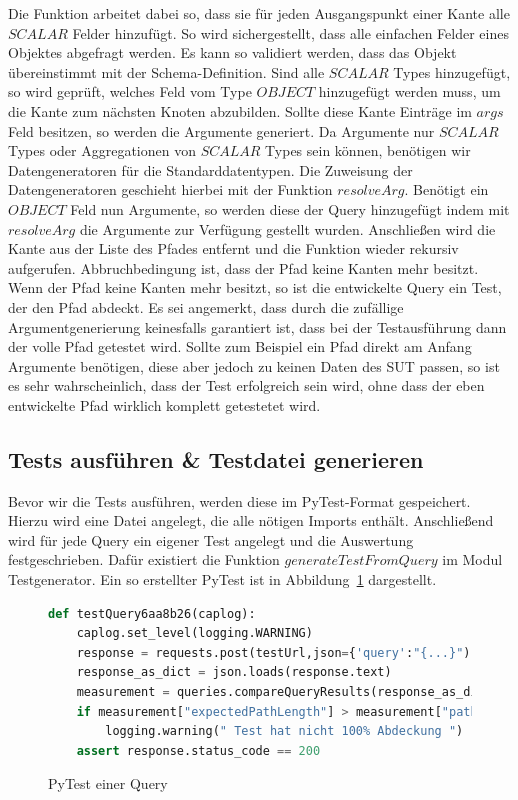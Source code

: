 Die Funktion arbeitet dabei so, dass sie für jeden Ausgangspunkt einer Kante alle $SCALAR$ Felder hinzufügt.
So wird sichergestellt, dass alle einfachen Felder eines Objektes abgefragt werden.
Es kann so validiert werden, dass das Objekt übereinstimmt mit der Schema-Definition.
Sind alle $SCALAR$ Types hinzugefügt, so wird geprüft, welches Feld vom Type $OBJECT$ hinzugefügt werden muss, um die Kante zum nächsten Knoten abzubilden.
Sollte diese Kante Einträge im $args$ Feld besitzen, so werden die Argumente generiert.
Da Argumente nur $SCALAR$ Types oder Aggregationen von $SCALAR$ Types sein können, benötigen wir Datengeneratoren für die Standarddatentypen.
Die Zuweisung der Datengeneratoren geschieht hierbei mit der Funktion $resolveArg$.
Benötigt ein $OBJECT$ Feld nun Argumente, so werden diese der Query hinzugefügt indem mit $resolveArg$ die Argumente zur Verfügung gestellt wurden.
Anschließen wird die Kante aus der Liste des Pfades entfernt und die Funktion wieder rekursiv aufgerufen.
Abbruchbedingung ist, dass der Pfad keine Kanten mehr besitzt.
Wenn der Pfad keine Kanten mehr besitzt, so ist die entwickelte Query ein Test, der den Pfad abdeckt.
Es sei angemerkt, dass durch die zufällige Argumentgenerierung keinesfalls garantiert ist, dass bei der Testausführung dann der volle Pfad getestet wird.
Sollte zum Beispiel ein Pfad direkt am Anfang Argumente benötigen, diese aber jedoch zu keinen Daten des SUT passen, so ist es sehr
wahrscheinlich, dass der Test erfolgreich sein wird, ohne dass der eben entwickelte Pfad wirklich komplett getestetet wird.
\newpage

\subsection{Tests ausführen \& Testdatei generieren}

Bevor wir die Tests ausführen, werden diese im PyTest-Format gespeichert.
Hierzu wird eine Datei angelegt, die alle nötigen Imports enthält.
Anschließend wird für jede Query ein eigener Test angelegt und die Auswertung festgeschrieben.
Dafür existiert die Funktion $generateTestFromQuery$ im Modul Testgenerator.
Ein so erstellter PyTest ist in Abbildung~\ref{pytestt} dargestellt.

\begin{figure}[H]
    \begin{lstlisting}[language=Python]
def testQuery6aa8b26(caplog):
    caplog.set_level(logging.WARNING)
    response = requests.post(testUrl,json={'query':"{...}")
    response_as_dict = json.loads(response.text)
    measurement = queries.compareQueryResults(response_as_dict, "{...}")
    if measurement["expectedPathLength"] > measurement["pathLengthFromResult"]:
        logging.warning(" Test hat nicht 100% Abdeckung ")
    assert response.status_code == 200
    \end{lstlisting}
    \caption{PyTest einer Query}
    \label{pytestt}
\end{figure}


